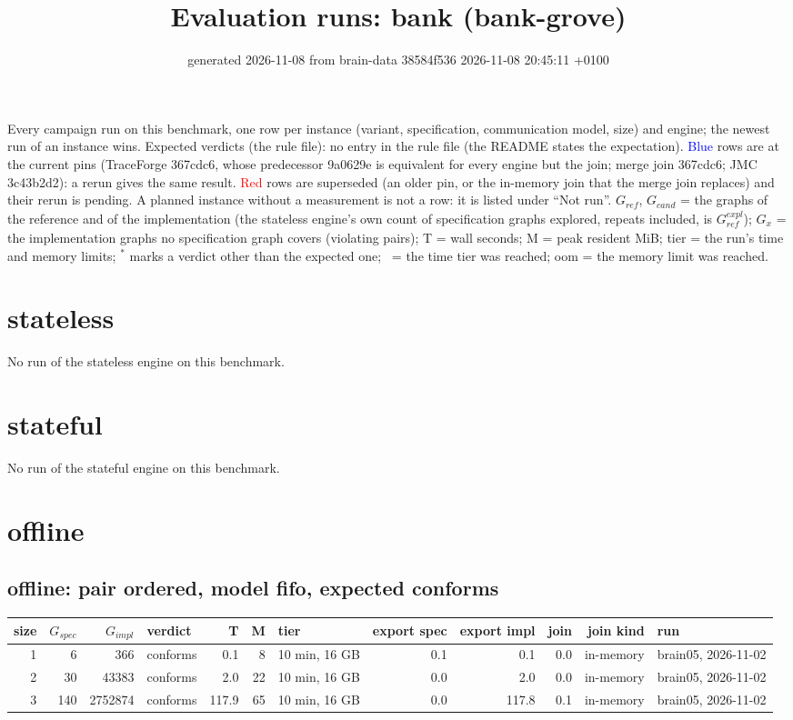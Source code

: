 \documentclass[10pt]{article}
\title{Evaluation runs: \textsf{bank} (bank-grove)}
\author{}
\date{generated 2026-11-08 from brain-data 38584f536 2026-11-08 20:45:11 +0100}
\begin{document}
\maketitle\small
\noindent Every campaign run on this benchmark, one row per instance (variant, specification, communication model, size) and engine; the newest run of an instance wins. Expected verdicts (the rule file): no entry in the rule file (the README states the expectation). \textcolor{blue}{Blue} rows are at the current pins (TraceForge 367cdc6, whose predecessor 9a0629e is equivalent for every engine but the join; merge join 367cdc6; JMC 3c43b2d2): a rerun gives the same result. \textcolor{red}{Red} rows are superseded (an older pin, or the in-memory join that the merge join replaces) and their rerun is pending. A planned instance without a measurement is not a row: it is listed under ``Not run''. $G_{\mathit{ref}}$, $G_{\mathit{cand}}$ = the graphs of the reference and of the implementation (the stateless engine's own count of specification graphs explored, repeats included, is $G_{\mathit{ref}}^{\mathit{expl}}$); $G_x$ = the implementation graphs no specification graph covers (violating pairs); T = wall seconds; M = peak resident MiB; tier = the run's time and memory limits; $^{\ast}$ marks a verdict other than the expected one; \faClock\ = the time tier was reached; oom = the memory limit was reached.

\section*{stateless}\noindent No run of the stateless engine on this benchmark.
\section*{stateful}\noindent No run of the stateful engine on this benchmark.
\section*{offline}
\subsection*{offline: pair \textsf{ordered}, model fifo, expected conforms}
\begin{longtable}{@{}rrrlrrlrrrrl@{}}
\toprule
size & $G_{\mathit{spec}}$ & $G_{\mathit{impl}}$ & verdict & T & M & tier & export spec & export impl & join & join kind & run \\
\midrule
\endhead
\color{red} 1 & 6 & 366 & conforms & 0.1 & 8 & 10 min, 16 GB & 0.1 & 0.1 & 0.0 & in-memory & brain05, 2026-11-02 \\
\color{red} 2 & 30 & 43383 & conforms & 2.0 & 22 & 10 min, 16 GB & 0.0 & 2.0 & 0.0 & in-memory & brain05, 2026-11-02 \\
\color{red} 3 & 140 & 2752874 & conforms & 117.9 & 65 & 10 min, 16 GB & 0.0 & 117.8 & 0.1 & in-memory & brain05, 2026-11-02 \\
\bottomrule
\end{longtable}
\end{document}
